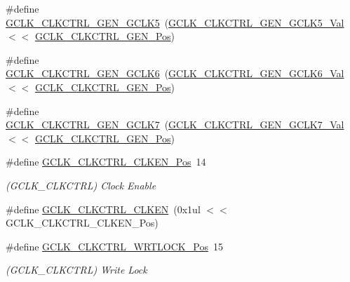 \begin{DoxyCompactItemize}
\item 
\#define \mbox{\hyperlink{group___s_a_m_d21___g_c_l_k_ga5d2ab62c417f641f9c0050b64ef35696}{G\+C\+L\+K\+\_\+\+C\+L\+K\+C\+T\+R\+L\+\_\+\+G\+E\+N\+\_\+\+G\+C\+L\+K5}}~(\mbox{\hyperlink{group___s_a_m_d21___g_c_l_k_ga14e18a1b5c8919f1a3e8c679b3b17f9d}{G\+C\+L\+K\+\_\+\+C\+L\+K\+C\+T\+R\+L\+\_\+\+G\+E\+N\+\_\+\+G\+C\+L\+K5\+\_\+\+Val}}    $<$$<$ \mbox{\hyperlink{group___s_a_m_d21___g_c_l_k_gae80d1faef3b42edf73de73feef846841}{G\+C\+L\+K\+\_\+\+C\+L\+K\+C\+T\+R\+L\+\_\+\+G\+E\+N\+\_\+\+Pos}})
\item 
\#define \mbox{\hyperlink{group___s_a_m_d21___g_c_l_k_ga6cd3d90c7a49aee40e1b8157b3eb516a}{G\+C\+L\+K\+\_\+\+C\+L\+K\+C\+T\+R\+L\+\_\+\+G\+E\+N\+\_\+\+G\+C\+L\+K6}}~(\mbox{\hyperlink{group___s_a_m_d21___g_c_l_k_gaffc6f215a6671305caaeb6f9e38264d6}{G\+C\+L\+K\+\_\+\+C\+L\+K\+C\+T\+R\+L\+\_\+\+G\+E\+N\+\_\+\+G\+C\+L\+K6\+\_\+\+Val}}    $<$$<$ \mbox{\hyperlink{group___s_a_m_d21___g_c_l_k_gae80d1faef3b42edf73de73feef846841}{G\+C\+L\+K\+\_\+\+C\+L\+K\+C\+T\+R\+L\+\_\+\+G\+E\+N\+\_\+\+Pos}})
\item 
\#define \mbox{\hyperlink{group___s_a_m_d21___g_c_l_k_gae42e43dfe46961959902cb893ce69121}{G\+C\+L\+K\+\_\+\+C\+L\+K\+C\+T\+R\+L\+\_\+\+G\+E\+N\+\_\+\+G\+C\+L\+K7}}~(\mbox{\hyperlink{group___s_a_m_d21___g_c_l_k_gaf0ef8769af1146d5f756a515bba69892}{G\+C\+L\+K\+\_\+\+C\+L\+K\+C\+T\+R\+L\+\_\+\+G\+E\+N\+\_\+\+G\+C\+L\+K7\+\_\+\+Val}}    $<$$<$ \mbox{\hyperlink{group___s_a_m_d21___g_c_l_k_gae80d1faef3b42edf73de73feef846841}{G\+C\+L\+K\+\_\+\+C\+L\+K\+C\+T\+R\+L\+\_\+\+G\+E\+N\+\_\+\+Pos}})
\item 
\#define \mbox{\hyperlink{group___s_a_m_d21___g_c_l_k_ga988366053ec34c5f63659a49e0f20d3e}{G\+C\+L\+K\+\_\+\+C\+L\+K\+C\+T\+R\+L\+\_\+\+C\+L\+K\+E\+N\+\_\+\+Pos}}~14
\begin{DoxyCompactList}\small\item\em (G\+C\+L\+K\+\_\+\+C\+L\+K\+C\+T\+RL) Clock Enable \end{DoxyCompactList}\item 
\#define \mbox{\hyperlink{group___s_a_m_d21___g_c_l_k_gaf59d41452f57905af7c54ef67d5e5349}{G\+C\+L\+K\+\_\+\+C\+L\+K\+C\+T\+R\+L\+\_\+\+C\+L\+K\+EN}}~(0x1ul $<$$<$ G\+C\+L\+K\+\_\+\+C\+L\+K\+C\+T\+R\+L\+\_\+\+C\+L\+K\+E\+N\+\_\+\+Pos)
\item 
\#define \mbox{\hyperlink{group___s_a_m_d21___g_c_l_k_ga380347dc132352716e030880aba8b807}{G\+C\+L\+K\+\_\+\+C\+L\+K\+C\+T\+R\+L\+\_\+\+W\+R\+T\+L\+O\+C\+K\+\_\+\+Pos}}~15
\begin{DoxyCompactList}\small\item\em (G\+C\+L\+K\+\_\+\+C\+L\+K\+C\+T\+RL) Write Lock \end{DoxyCompactList}\item 

\end{DoxyCompactItemize}
